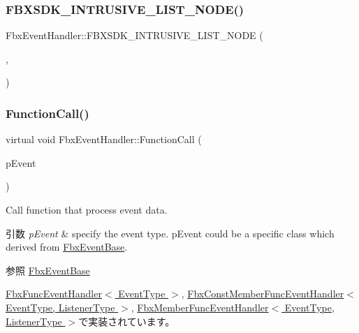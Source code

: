\subsubsection{\texorpdfstring{F\+B\+X\+S\+D\+K\+\_\+\+I\+N\+T\+R\+U\+S\+I\+V\+E\+\_\+\+L\+I\+S\+T\+\_\+\+N\+O\+D\+E()}{FBXSDK\_INTRUSIVE\_LIST\_NODE()}}
{\footnotesize\ttfamily Fbx\+Event\+Handler\+::\+F\+B\+X\+S\+D\+K\+\_\+\+I\+N\+T\+R\+U\+S\+I\+V\+E\+\_\+\+L\+I\+S\+T\+\_\+\+N\+O\+DE (\begin{DoxyParamCaption}\item[{\hyperlink{class_fbx_event_handler}{Fbx\+Event\+Handler}}]{,  }\item[{\hyperlink{class_fbx_event_handler_a47139da2cfd5abee91664d75c4fb577ca2c6941dcdf691c32251fae0beabeadb2}{e\+Count}}]{ }\end{DoxyParamCaption})}

\mbox{\label{class_fbx_event_handler_a46357ba45116a30c8f53c3e5fe9ba2fb}} 
\subsubsection{\texorpdfstring{Function\+Call()}{FunctionCall()}}
{\footnotesize\ttfamily virtual void Fbx\+Event\+Handler\+::\+Function\+Call (\begin{DoxyParamCaption}\item[{const \hyperlink{class_fbx_event_base}{Fbx\+Event\+Base} \&}]{p\+Event }\end{DoxyParamCaption})\hspace{0.3cm}{\ttfamily [pure virtual]}}

Call function that process event data. 
\begin{DoxyParams}{引数}
{\em p\+Event} & specify the event type. p\+Event could be a specific class which derived from \hyperlink{class_fbx_event_base}{Fbx\+Event\+Base}. \\
\hline
\end{DoxyParams}
\begin{DoxySeeAlso}{参照}
\hyperlink{class_fbx_event_base}{Fbx\+Event\+Base} 
\end{DoxySeeAlso}


\hyperlink{class_fbx_func_event_handler_a6111e1a7e1a0e60170a2de498fe44766}{Fbx\+Func\+Event\+Handler$<$ Event\+Type $>$}, \hyperlink{class_fbx_const_member_func_event_handler_ae6c6805404e8045de40289893709dc54}{Fbx\+Const\+Member\+Func\+Event\+Handler$<$ Event\+Type, Listener\+Type $>$}, \hyperlink{class_fbx_member_func_event_handler_a4bcb037442927d480776bc2fb4b7bcd6}{Fbx\+Member\+Func\+Event\+Handler$<$ Event\+Type, Listener\+Type $>$}で実装されています。

